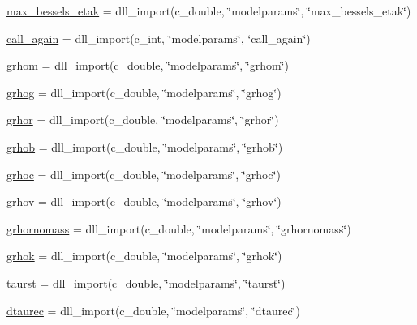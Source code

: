 \begin{DoxyCompactItemize}
\item 
\mbox{\hyperlink{namespacecamb_1_1model_ac478e5bbe29bbc4d022d72695093992c}{max\+\_\+bessels\+\_\+etak}} = dll\+\_\+import(c\+\_\+double, \char`\"{}modelparams\char`\"{}, \char`\"{}max\+\_\+bessels\+\_\+etak\char`\"{})
\item 
\mbox{\hyperlink{namespacecamb_1_1model_ae8eaa5eb5a3616c14ad391820437fda1}{call\+\_\+again}} = dll\+\_\+import(c\+\_\+int, \char`\"{}modelparams\char`\"{}, \char`\"{}call\+\_\+again\char`\"{})
\item 
\mbox{\hyperlink{namespacecamb_1_1model_a3f8d35a6caaf48f968ec4abb112bc8e1}{grhom}} = dll\+\_\+import(c\+\_\+double, \char`\"{}modelparams\char`\"{}, \char`\"{}grhom\char`\"{})
\item 
\mbox{\hyperlink{namespacecamb_1_1model_afc692d0dfcb8c658f757e3aa2ba2a75a}{grhog}} = dll\+\_\+import(c\+\_\+double, \char`\"{}modelparams\char`\"{}, \char`\"{}grhog\char`\"{})
\item 
\mbox{\hyperlink{namespacecamb_1_1model_af769aaea323cd956bd13dcb8064e7b96}{grhor}} = dll\+\_\+import(c\+\_\+double, \char`\"{}modelparams\char`\"{}, \char`\"{}grhor\char`\"{})
\item 
\mbox{\hyperlink{namespacecamb_1_1model_aa74d5bdefd9c9f2c8b5cb678991c3321}{grhob}} = dll\+\_\+import(c\+\_\+double, \char`\"{}modelparams\char`\"{}, \char`\"{}grhob\char`\"{})
\item 
\mbox{\hyperlink{namespacecamb_1_1model_ad26ec37a48f754a1995f5e552c3fa20b}{grhoc}} = dll\+\_\+import(c\+\_\+double, \char`\"{}modelparams\char`\"{}, \char`\"{}grhoc\char`\"{})
\item 
\mbox{\hyperlink{namespacecamb_1_1model_ac1951d53b75d4a09c54a90ae7a33c1dc}{grhov}} = dll\+\_\+import(c\+\_\+double, \char`\"{}modelparams\char`\"{}, \char`\"{}grhov\char`\"{})
\item 
\mbox{\hyperlink{namespacecamb_1_1model_a060a0ab339fdd04f13e45b099d7f7a95}{grhornomass}} = dll\+\_\+import(c\+\_\+double, \char`\"{}modelparams\char`\"{}, \char`\"{}grhornomass\char`\"{})
\item 
\mbox{\hyperlink{namespacecamb_1_1model_ab5600680d4e6b2d92352832db9330d27}{grhok}} = dll\+\_\+import(c\+\_\+double, \char`\"{}modelparams\char`\"{}, \char`\"{}grhok\char`\"{})
\item 
\mbox{\hyperlink{namespacecamb_1_1model_afb4a7608d424f3a923f666bc95b4ce91}{taurst}} = dll\+\_\+import(c\+\_\+double, \char`\"{}modelparams\char`\"{}, \char`\"{}taurst\char`\"{})
\item 
\mbox{\hyperlink{namespacecamb_1_1model_a1f81c88f4d8cf070a8d1cca3904063e8}{dtaurec}} = dll\+\_\+import(c\+\_\+double, \char`\"{}modelparams\char`\"{}, \char`\"{}dtaurec\char`\"{})

\end{DoxyCompactItemize}
